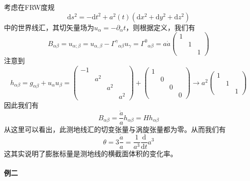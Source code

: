 \documentclass[hyperref, UTF8, a4paper]{ctexart}
\begin{document}
考虑在FRW度规
\begin{equation*}
	\mathrm{d} s^{2} =-\mathrm{d} t^{2} +a^{2}( t)\left(\mathrm{d} x^{2} +\mathrm{d} y^{2} +\mathrm{d} z^{2}\right)
\end{equation*}
中的世界线汇，其切矢量场为$u_{\alpha } =-\partial _{\alpha } t$，则根据定义，我们有
\begin{equation*}
	B_{\alpha \beta } =u_{\alpha ;\beta } =u_{\alpha ,\beta } -\Gamma ^{\gamma }{}_{\alpha \beta } u_{\gamma } =\Gamma ^{0}{}_{\alpha \beta } =a\dot{a}\begin{pmatrix}
		1 &  & \\
		& 1 & \\
		&  & 1
	\end{pmatrix}
\end{equation*}
注意到
\begin{equation*}
	h_{\alpha \beta } =g_{\alpha \beta } +u_{\alpha } u_{\beta } =\begin{pmatrix}
		-1 &  &  & \\
		& a^{2} &  & \\
		&  & a^{2} & \\
		&  &  & a^{2}
	\end{pmatrix} +\begin{pmatrix}
		1 &  &  & \\
		& 0 &  & \\
		&  & 0 & \\
		&  &  & 0
	\end{pmatrix}\rightarrow a^{2}\begin{pmatrix}
		1 &  & \\
		& 1 & \\
		&  & 1
	\end{pmatrix}
\end{equation*}
因此我们有
\begin{equation*}
	B_{\alpha \beta } =\frac{\dot{a}}{a} h_{\alpha \beta } =Hh_{\alpha \beta }
\end{equation*}
从这里可以看出，此测地线汇的切变张量与涡旋张量都为零。从而我们有
\begin{equation*}
	\theta =3\frac{\dot{a}}{a} =\frac{1}{a^{3}}\frac{\mathrm{d}}{\mathrm{d} t} a^{3}
\end{equation*}
这其实说明了膨胀标量是测地线的横截面体积的变化率。


\paragraph{例二}
\end{document}
